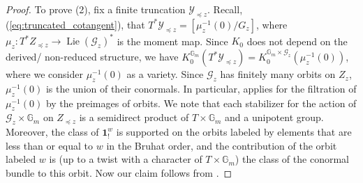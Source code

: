 \documentclass{amsart}
\newcommand{\Ring}{\mathsf{R}}
\newcommand{\bone}{\mathbf{1}}
\theoremstyle{definition}
\numberwithin{equation}{section}
\begin{document}
\begin{proof}
To prove (2), fix a finite truncation $\mathcal{Y}_{\preceq z}$. Recall, (\ref{eq:truncated_cotangent}), that $T^*\mathcal{Y}_{\preceq z}=[\mu^{-1}_z(0)/G_z]$, where $\mu_z:T^*Z_{\preceq z}\rightarrow \operatorname{Lie}(\mathcal{G}_z)^*$ is the moment map. Since $K_0$ does not depend on the derived/ non-reduced structure, we have $K_0^{\mathbb{G}_m}(T^*\mathcal{Y}_{\preceq z})=K_0^{\mathbb{G}_m\times \mathcal{G}_z}(\mu_z^{-1}(0))$, where we consider $\mu_z^{-1}(0)$ as a variety. Since $\mathcal{G}_z$ has finitely many orbits on $Z_z$, $\mu_z^{-1}(0)$ is the union of their conormals. In particular, \cite[Lemma 5.5.1]{CG} applies for the filtration of $\mu_z^{-1}(0)$ by the preimages of orbits. We note that each stabilizer for the action of $\mathcal{G}_z\times \mathbb{G}_m$ on $Z_{\preceq z}$ is a semidirect product of $T\times \mathbb{G}_m$ and a unipotent group. Moreover,  the class of $\bone^w_!$ is supported on the orbits labeled by elements that are less than or equal to $w$ in the Bruhat order, and the contribution of the orbit labeled $w$ is (up to a twist with a character of $T\times \mathbb{G}_m$) 
the class of the conormal bundle to this orbit.
Now our claim follows from  \cite[Lemma 5.5.1]{CG}.
\end{proof}
\end{document}
